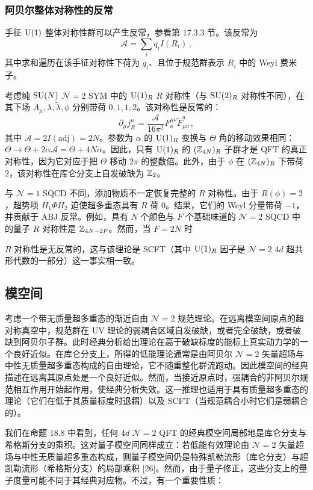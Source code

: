 \subsubsection*{阿贝尔整体对称性的反常}

手征 $\operatorname{U}(1)$ 整体对称性群可以产生反常，参看第 17.3.3 节。该反常为
\[
\mathcal A=\sum_i q_i I(R_i)\,,
\]
其中求和遍历在该手征对称性下荷为 $q_i$、且位于规范群表示 $R_i$ 中的 Weyl 费米子。

考虑纯 $\operatorname{SU}(N)$ $\mathcal N=2$ SYM 中的 $\operatorname{U}(1)_R$ $R$ 对称性（与 $\operatorname{SU}(2)_R$ 对称性不同），在其下场 $A_\mu,\lambda,\tilde\lambda,\phi$ 分别带荷 $0,1,1,2$。该对称性是反常的：
\[
\partial_\mu j^\mu_R=\frac{\mathcal A}{16\pi^2}F^{\mu\nu}_a\widetilde F^a_{\mu\nu}\,,
\]
其中 $\mathcal A=2I(\mathrm{adj})=2N$。参数为 $\alpha$ 的 $\operatorname{U}(1)_R$ 变换与 $\Theta$ 角的移动效果相同：$\Theta\to\Theta+2\alpha\mathcal A=\Theta+4N\alpha$。因此，只有 $\operatorname{U}(1)_R$ 的 $(\mathbb{Z}_{4N})_R$ 子群才是 QFT 的真正对称性，因为它对应于把 $\Theta$ 移动 $2\pi$ 的整数倍。此外，由于 $\phi$ 在 $(\mathbb{Z}_{4N})_R$ 下带荷 $2$，该对称性在库仑分支上自发破缺为 $\mathbb{Z}_2$。

与 $\mathcal N=1$ SQCD 不同，添加物质不一定恢复完整的 $R$ 对称性。由于 $R(\phi)=2$，超势项 $H_1\Phi H_2$ 迫使超多重态具有 $R$ 荷 $0$。结果，它们的 Weyl 分量带荷 $-1$，并贡献于 ABJ 反常。例如，具有 $N$ 个颜色与 $F$ 个基础味道的 $\mathcal N=2$ SQCD 中的量子 $R$ 对称性是 $\mathbb{Z}_{4N-2F}$。然而，当 $F=2N$ 时

$R$ 对称性是无反常的，这与该理论是 SCFT（其中 $\operatorname{U}(1)_R$ 因子是 $\mathcal N=2$ $4d$ 超共形代数的一部分）这一事实相一致。

\subsection{模空间}

考虑一个带无质量超多重态的渐近自由 $\mathcal N=2$ 规范理论。在远离模空间原点的超对称真空中，规范群在 UV 理论的弱耦合区域自发破缺，或者完全破缺，或者破缺到阿贝尔子群。此时经典分析给出理论在高于破缺标度的能标上真实动力学的一个良好近似。在库仑分支上，所得的低能理论通常是由阿贝尔 $\mathcal N=2$ 矢量超场与中性无质量超多重态构成的自由理论，它不随重整化群流跑动。因此模空间的经典描述在远离其原点处是一个良好近似。然而，当接近原点时，强耦合的非阿贝尔规范相互作用开始起作用，使经典分析失效。这一推理也适用于具有质量超多重态的理论（它们在低于其质量标度时退耦）以及 SCFT（当规范耦合小时它们是弱耦合的）。

我们在命题 18.8 中看到，任何 $4d$ $\mathcal N=2$ QFT 的经典模空间局部地是库仑分支与希格斯分支的乘积。这对量子模空间同样成立：若低能有效理论由 $\mathcal N=2$ 矢量超场与中性无质量超多重态构成，则量子模空间仍是特殊凯勒流形（库仑分支）与超凯勒流形（希格斯分支）的局部乘积 [26]。然而，由于量子修正，这些分支上的量子度量可能不同于其经典对应物。不过，有一个重要性质：

